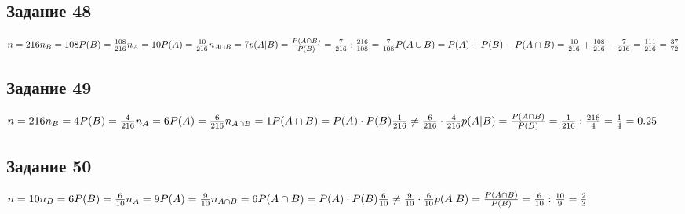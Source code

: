 \documentclass[12pt]{article}
\begin{document}
\newpage
\subsection{Задание 48}

$
n=216\\
 n_B=108\\
P(B)=\frac{108}{216}\\
n_{A}=10\\
P(A)=\frac{10}{216}\\
n_{A\cap B}=7\\
p(A|B)=\frac{P(A\cap B)}{P(B)}=\frac{7}{216} : \frac{216}{108}=\frac{7}{108}\\
P(A\cup B)=P(A)+P(B)-P(A\cap B)=\frac{10}{216} + \frac{108}{216} - \frac{7}{216} = 
\frac{111}{216}=
\frac{37}{72}
$


\newpage
\subsection{Задание 49}

$
n=216\\
 n_B=4\\
P(B)=\frac{4}{216}\\
n_{A}=6\\
P(A)=\frac{6}{216}\\
n_{A\cap B}=1\\
P(A\cap B)=P(A)\cdot P(B)\\
\frac{1}{216} \neq \frac{6}{216} \cdot \frac{4}{216} \\
p(A|B)=\frac{P(A\cap B)}{P(B)}=\frac{1}{216} : \frac{216}{4}=\frac{1}{4}=0.25\\
$

\newpage
\subsection{Задание 50}

$
n=10\\
 n_B=6\\
P(B)=\frac{6}{10}\\
n_{A}=9\\
P(A)=\frac{9}{10}\\
n_{A\cap B}=6\\
P(A\cap B)=P(A)\cdot P(B)\\
\frac{6}{10} \neq \frac{9}{10} \cdot \frac{6}{10} \\
p(A|B)=\frac{P(A\cap B)}{P(B)}=\frac{6}{10} : \frac{10}{9}=\frac{2}{3}\\
$
\end{document}
